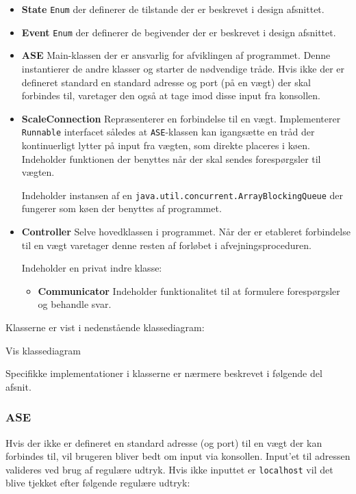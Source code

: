 \documentclass[a4paper]{article}
\begin{document}
\begin{itemize}
  \item \textbf{State} \texttt{Enum} der definerer de tilstande der er beskrevet i design afsnittet.
  \item \textbf{Event} \texttt{Enum} der definerer de begivender der er beskrevet i design afsnittet.
  \item \textbf{ASE} Main-klassen der er ansvarlig for afviklingen af programmet. Denne instantierer de andre klasser og starter de nødvendige tråde. Hvis ikke der er defineret standard en standard adresse og port (på en vægt) der skal forbindes til, varetager den også at tage imod disse input fra konsollen.
  \item \textbf{ScaleConnection} Repræsenterer en forbindelse til en vægt. Implementerer \texttt{Runnable} interfacet således at \texttt{ASE}-klassen kan igangsætte en tråd der kontinuerligt lytter på input fra vægten, som direkte placeres i køen. Indeholder funktionen der benyttes når der skal sendes forespørgsler til vægten.

    Indeholder instansen af en \texttt{java.util.concurrent.ArrayBlockingQueue} der fungerer som køen der benyttes af programmet.
  \item \textbf{Controller} Selve hovedklassen i programmet. Når der er etableret forbindelse til en vægt varetager denne resten af forløbet i afvejningsproceduren.

    Indeholder en privat indre klasse:
    \begin{itemize}
      \item \textbf{Communicator} Indeholder funktionalitet til at formulere forespørgsler og behandle svar.
    \end{itemize}
\end{itemize}

Klasserne er vist i nedenstående klassediagram:

\begin{center}
  Vis klassediagram
\end{center}

Specifikke implementationer i klasserne er nærmere beskrevet i følgende del afsnit.

\subsubsection{ASE} %

Hvis der ikke er defineret en standard adresse (og port) til en vægt der kan forbindes til, vil brugeren bliver bedt om input via konsollen. Input'et til adressen valideres ved brug af regulære udtryk. Hvis ikke inputtet er \texttt{localhost} vil det blive tjekket efter følgende regulære udtryk:
\end{document}
